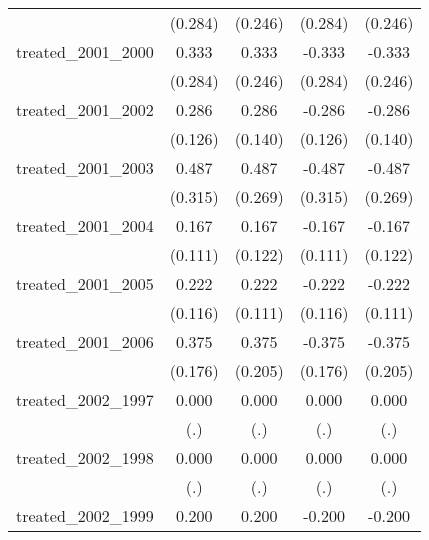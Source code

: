 {\begin{tabular}{l*{4}{c}}
            &     (0.284)         &     (0.246)         &     (0.284)         &     (0.246)         \\
[1em]
treated\_2001\_2000&       0.333         &       0.333         &      -0.333         &      -0.333         \\
            &     (0.284)         &     (0.246)         &     (0.284)         &     (0.246)         \\
[1em]
treated\_2001\_2002&       0.286\sym{*}  &       0.286\sym{*}  &      -0.286\sym{*}  &      -0.286\sym{*}  \\
            &     (0.126)         &     (0.140)         &     (0.126)         &     (0.140)         \\
[1em]
treated\_2001\_2003&       0.487         &       0.487         &      -0.487         &      -0.487         \\
            &     (0.315)         &     (0.269)         &     (0.315)         &     (0.269)         \\
[1em]
treated\_2001\_2004&       0.167         &       0.167         &      -0.167         &      -0.167         \\
            &     (0.111)         &     (0.122)         &     (0.111)         &     (0.122)         \\
[1em]
treated\_2001\_2005&       0.222         &       0.222\sym{*}  &      -0.222         &      -0.222\sym{*}  \\
            &     (0.116)         &     (0.111)         &     (0.116)         &     (0.111)         \\
[1em]
treated\_2001\_2006&       0.375\sym{*}  &       0.375         &      -0.375\sym{*}  &      -0.375         \\
            &     (0.176)         &     (0.205)         &     (0.176)         &     (0.205)         \\
[1em]
treated\_2002\_1997&       0.000         &       0.000         &       0.000         &       0.000         \\
            &         (.)         &         (.)         &         (.)         &         (.)         \\
[1em]
treated\_2002\_1998&       0.000         &       0.000         &       0.000         &       0.000         \\
            &         (.)         &         (.)         &         (.)         &         (.)         \\
[1em]
treated\_2002\_1999&       0.200         &       0.200         &      -0.200         &      -0.200         \\

\end{tabular}}

